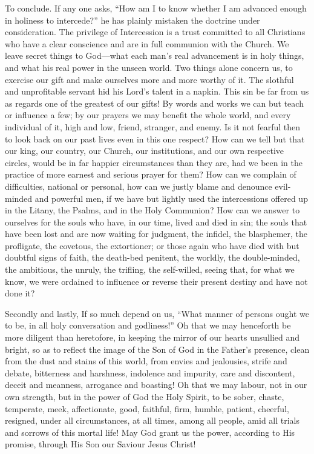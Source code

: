 To conclude. If any one asks, ``How am I to know whether I am
advanced enough in holiness to intercede?'' he has plainly
mistaken the doctrine under consideration. The privilege of
Intercession is a trust committed to all Christians who have a clear
conscience and are in full communion with the Church. We leave secret
things to God—what each man's real advancement is in holy things,
and what his real power in the unseen world. Two things alone concern
us, to exercise our gift and make ourselves more and more worthy of
it. The slothful and unprofitable servant hid his Lord's talent in a
napkin. This sin be far from us as regards one of the greatest of our
gifts! By words and works we can but teach or influence a few; by our
prayers we may benefit the whole world, and every individual of it,
high and low, friend, stranger, and enemy. Is it not fearful then to
look back on our past lives even in this one respect? How can we tell
but that our king, our country, our Church, our institutions, and our
own respective circles, would be in far happier circumstances than
they are, had we been in the practice of more earnest and serious
prayer for them? How can we complain of difficulties, national or
personal, how can we justly blame and denounce evil-minded and
powerful men, if we have but lightly used the intercessions offered up
in the Litany, the Psalms, and in the Holy Communion? How can we
answer to ourselves for the souls who have, in our time, lived and
died in sin; the souls that have been lost and are now waiting for
judgment, the infidel, the blasphemer, the profligate, the covetous,
the extortioner; or those again who have died with but doubtful signs
of faith, the death-bed penitent, the worldly, the double-minded, the
ambitious, the unruly, the trifling, the self-willed, seeing that, for
what we know, we were ordained to influence or reverse their present
destiny and have not done it?

Secondly and lastly, If so much depend on us, ``What manner of
persons ought we to be, in all holy conversation and godliness!''
Oh that we may henceforth be more diligent than heretofore, in keeping
the mirror of our hearts unsullied and bright, so as to reflect the
image of the Son of God in the Father's presence, clean from the
dust and stains of this world, from envies and jealousies, strife and
debate, bitterness and harshness, indolence and impurity, care and
discontent, deceit and meanness, arrogance and boasting! Oh that we
may labour, not in our own strength, but in the power of God the Holy
Spirit, to be sober, chaste, temperate, meek, affectionate, good,
faithful, firm, humble, patient, cheerful, resigned, under all
circumstances, at all times, among all people, amid all trials and
sorrows of this mortal life! May God grant us the power, according to
His promise, through His Son our Saviour Jesus Christ!


